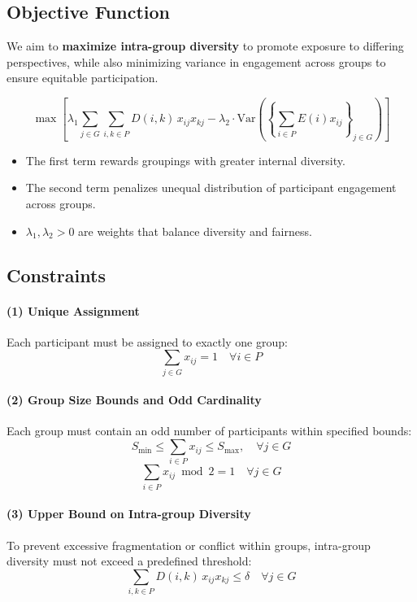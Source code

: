 \documentclass[11pt,a4paper]{article}
\begin{document}
\subsection{Objective Function}

We aim to \textbf{maximize intra-group diversity} to promote exposure to differing perspectives, while also minimizing variance in engagement across groups to ensure equitable participation.

\[
\max \left[
\lambda_1 \sum_{j \in G} \sum_{i,k \in P} D(i,k)\,x_{ij} x_{kj}
- \lambda_2 \cdot \mathrm{Var}\left( \left\{ \sum_{i \in P} E(i) x_{ij} \right\}_{j \in G} \right)
\right]
\]

\begin{itemize}
    \item The first term rewards groupings with greater internal diversity.
    \item The second term penalizes unequal distribution of participant engagement across groups.
    \item $\lambda_1, \lambda_2 > 0$ are weights that balance diversity and fairness.
\end{itemize}

\subsection{Constraints}

\paragraph{(1) Unique Assignment}
Each participant must be assigned to exactly one group:
\[
\sum_{j \in G} x_{ij} = 1 \quad \forall i \in P
\]

\paragraph{(2) Group Size Bounds and Odd Cardinality}
Each group must contain an odd number of participants within specified bounds:
\[
S_{\min} \leq \sum_{i \in P} x_{ij} \leq S_{\max}, \quad \forall j \in G
\]
\[
\sum_{i \in P} x_{ij} \bmod 2 = 1 \quad \forall j \in G
\]

\paragraph{(3) Upper Bound on Intra-group Diversity}
To prevent excessive fragmentation or conflict within groups, intra-group diversity must not exceed a predefined threshold:
\[
\sum_{i,k \in P} D(i,k)\,x_{ij} x_{kj} \leq \delta \quad \forall j \in G
\]
\end{document}
